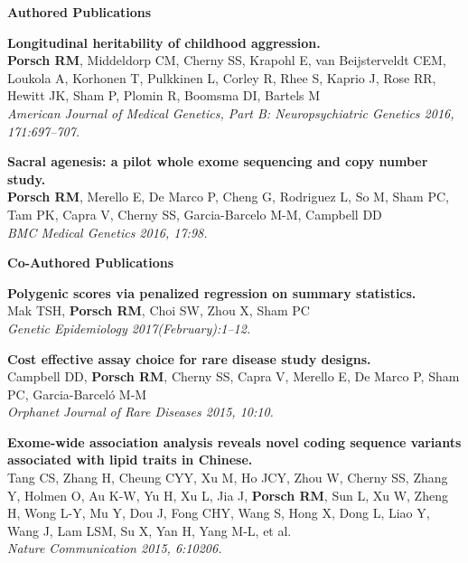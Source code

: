 \documentclass[header.tex]{subfiles}
\begin{document}
\begin{center}
\textbf{Authored Publications} \\
\end{center}

\noindent\textbf{Longitudinal heritability of childhood aggression.} \\
\textbf{Porsch RM}, Middeldorp CM, Cherny SS, Krapohl E, van Beijsterveldt CEM, Loukola A, Korhonen T, Pulkkinen L, Corley R, Rhee S, Kaprio J, Rose RR, Hewitt JK, Sham P, Plomin R, Boomsma DI, Bartels M \\
\textit{American Journal of Medical Genetics, Part B\@: Neuropsychiatric Genetics 2016, 171:697–707.} \\
\vspace{0.5cm}

\noindent \textbf{Sacral agenesis: a pilot whole exome sequencing and copy number study.} \\
\textbf{Porsch RM}, Merello E, De Marco P, Cheng G, Rodriguez L, So M, Sham PC, Tam PK, Capra V, Cherny SS, Garcia-Barcelo M-M, Campbell DD \\
\textit{BMC Medical Genetics 2016, 17:98.} \\
\vspace{0.5cm}

\begin{center}
\textbf{Co-Authored Publications} \\
\end{center}

\noindent\textbf{Polygenic scores via penalized regression on summary statistics.} \\
Mak TSH, \textbf{Porsch RM}, Choi SW, Zhou X, Sham PC \\
\textit{Genetic Epidemiology 2017(February):1–12.} \\
\vspace{0.5cm}

\noindent\textbf{Cost effective assay choice for rare disease study designs.} \\
Campbell DD, \textbf{Porsch RM}, Cherny SS, Capra V, Merello E, De Marco P, Sham PC, Garcia-Barceló M-M \\
\textit{Orphanet Journal of Rare Diseases 2015, 10:10.} \\
\vspace{0.5cm}

\noindent\textbf{Exome-wide association analysis reveals novel coding sequence variants associated with lipid traits in Chinese.} \\
Tang CS, Zhang H, Cheung CYY, Xu M, Ho JCY, Zhou W, Cherny SS, Zhang Y, Holmen O, Au K-W, Yu H, Xu L, Jia J, \textbf{Porsch RM}, Sun L, Xu W, Zheng H, Wong L-Y, Mu Y, Dou J, Fong CHY, Wang S, Hong X, Dong L, Liao Y, Wang J, Lam LSM, Su X, Yan H, Yang M-L, et al. \\
\textit{Nature Communication 2015, 6:10206.} \\
\vspace{0.5cm}
\end{document}

